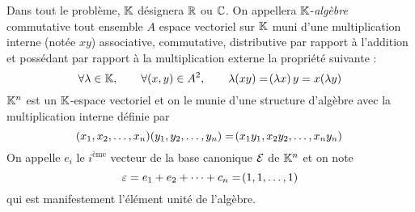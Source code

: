 \documentclass[a4paper,french,bookmarks]{article}
\begin{document}
    \renewcommand{\thesection}{\Roman{section}}
    \renewcommand{\thesection}{Partie \Roman{section}}
    \renewcommand{\labelenumi}{\Roman{section}.\arabic{enumi}.}
        \renewcommand*{\labelenumii}{\alph{enumii}.}
    
    
    Dans tout le problème, $\mathbb{K}$ désignera $\mathbb{R}$ ou $\mathbb{C}$. On appellera $\mathbb{K}$-\textit{algèbre} commutative tout ensemble $A$ espace vectoriel sur $\mathbb{K}$ muni d'une multiplication interne (notée $xy$) associative, commutative, distributive par rapport à l'addition et possédant par rapport à la multiplication externe la propriété suivante :
    \[ \forall \lambda \in \mathbb{K},\qquad \forall \!\left(x, y\right) \in A^2,\qquad \lambda\!\left(xy\right) = \!\left(\lambda x\right)y = x\!\left(\lambda y\right)\]
    $\mathbb{K}^n$ est un $\mathbb{K}$-espace vectoriel et on le munie d'une structure d'algèbre avec la multiplication interne définie par
    \[ \!\left(x_1, x_2, \dots, x_n\right)\!\left(y_1, y_2, \dots, y_n\right) = \!\left(x_1y_1, x_2y_2, \dots, x_ny_n\right) \]
    On appelle $e_i$ le $i^\text{ème}$ vecteur de la base canonique $\mathcal{E}$ de $\mathbb{K}^n$ et on note 
    \[ \varepsilon = e_1 + e_2 + \dots + c_n = \!\left(1, 1, \dots, 1\right)\]
    qui est manifestement l'élément unité de l'algèbre.
    
    \section{}
    
\end{document}
